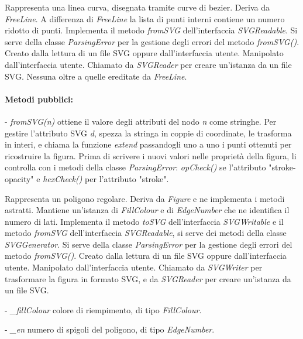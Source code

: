 Rappresenta una linea curva, disegnata tramite curve di bezier.
Deriva da \textit{FreeLine}. A differenza di \textit{FreeLine} la lista di punti interni contiene un numero ridotto di punti. Implementa il metodo \textit{fromSVG} dell'interfaccia \textit{SVGReadable}. Si serve della classe \textit{ParsingError} per la gestione degli errori del metodo \textit{fromSVG()}.
Creato dalla lettura di un file SVG oppure dall'interfaccia utente. Manipolato dall'interfaccia utente. Chiamato da \textit{SVGReader} per creare un'istanza da un file SVG.
Nessuna oltre a quelle ereditate da \textit{FreeLine}.
\paragraph{Metodi pubblici:}
\begin{elencopuntato}[\subsubsecindent]
\item[-] \textit{fromSVG(n)} ottiene il valore degli attributi del nodo \textit{n} come stringhe. Per gestire l'attributo SVG \textit{d}, spezza la stringa in coppie di coordinate, le trasforma in interi, e chiama la funzione \textit{extend} passandogli uno a uno i punti ottenuti per ricostruire la figura. Prima di scrivere i nuovi valori nelle propriet\`a della figura, li controlla con i metodi della classe \textit{ParsingError}: \textit{opCheck()} se l'attributo "stroke-opacity" e \textit{hexCheck()} per l'attributo "stroke".

\end{elencopuntato}


Rappresenta un poligono regolare.
Deriva da \textit{Figure} e ne implementa i metodi astratti. Mantiene un'istanza di \textit{FillColour} e di \textit{EdgeNumber} che ne identifica il numero di lati. Implementa il metodo \textit{toSVG} dell'interfaccia \textit{SVGWritable} e il metodo \textit{fromSVG} dell'interfaccia \textit{SVGReadable}, si serve dei metodi della classe \textit{SVGGenerator}. Si serve della classe \textit{ParsingError} per la gestione degli errori del metodo \textit{fromSVG()}.
Creato dalla lettura di un file SVG oppure dall'interfaccia utente. Manipolato dall'interfaccia utente. Chiamato da \textit{SVGWriter} per trasformare la figura in formato SVG, e da \textit{SVGReader} per creare un'istanza da un file SVG.
\begin{elencopuntato}[\subsubsecindent]
\item[-] \textit{{\_}fillColour} colore di riempimento, di tipo \textit{FillColour}.
\item[-] \textit{{\_}en} numero di spigoli del poligono, di tipo \textit{EdgeNumber}.
\end{elencopuntato}
